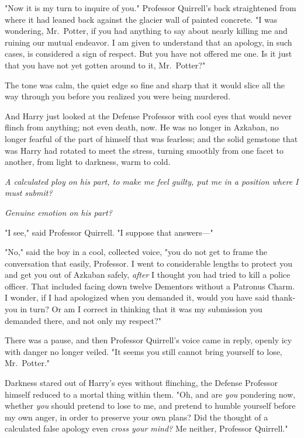 "Now it is my turn to inquire of you." Professor Quirrell's back straightened
from where it had leaned back against the glacier wall of painted concrete. "I
was wondering, Mr.~Potter, if you had anything to say about nearly killing me
and ruining our mutual endeavor. I am given to understand that an apology, in
such cases, is considered a sign of respect. But you have not offered me one.
Is it just that you have not yet gotten around to it, Mr.~Potter?"

The tone was calm, the quiet edge so fine and sharp that it would slice all the
way through you before you realized you were being murdered.

And Harry just looked at the Defense Professor with cool eyes that would never
flinch from anything; not even death, now. He was no longer in Azkaban, no
longer fearful of the part of himself that was fearless; and the solid gemstone
that was Harry had rotated to meet the stress, turning smoothly from one facet
to another, from light to darkness, warm to cold.

\emph{A calculated ploy on his part, to make me feel guilty, put me in a
position where I must submit?}

\emph{Genuine emotion on his part?}

"I see," said Professor Quirrell. "I suppose that answers\mbox{---}"

"No," said the boy in a cool, collected voice, "you do not get to frame the
conversation that easily, Professor. I went to considerable lengths to protect
you and get you out of Azkaban safely, \emph{after} I thought you had tried to
kill a police officer. That included facing down twelve Dementors without a
Patronus Charm. I wonder, if I had apologized when you demanded it, would you
have said thank-you in turn? Or am I correct in thinking that it was my
submission you demanded there, and not only my respect?"

There was a pause, and then Professor Quirrell's voice came in reply, openly
icy with danger no longer veiled. "It seems you still cannot bring yourself to
lose, Mr.~Potter."

Darkness stared out of Harry's eyes without flinching, the Defense Professor
himself reduced to a mortal thing within them. "Oh, and are \emph{you}
pondering now, whether \emph{you} should pretend to lose to me, and pretend to
humble yourself before my own anger, in order to preserve your own plans? Did
the thought of a calculated false apology even \emph{cross your mind?} Me
neither, Professor Quirrell."

